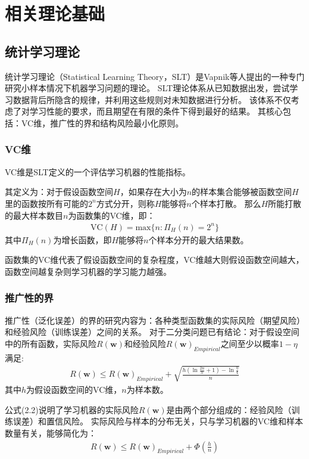 \chapter{相关理论基础}

\section{统计学习理论}

统计学习理论（Statistical Learning Theory，SLT）是Vapnik等人提出的一种专门研究小样本情况下机器学习问题的理论\cite{vapnik2013nature}。
SLT理论体系从已知数据出发，尝试学习数据背后所隐含的规律，并利用这些规则对未知数据进行分析。
该体系不仅考虑了对学习性能的要求，而且期望在有限的条件下得到最好的结果。
其核心包括：VC维，推广性的界和结构风险最小化原则。

\subsection{VC维}

VC维是SLT定义的一个评估学习机器的性能指标。

其定义为：对于假设函数空间$H$，如果存在大小为$n$的样本集合能够被函数空间$H$里的函数按所有可能的$2^n$方式分开，则称$H$能够将$n$个样本打散。
那么$H$所能打散的最大样本数目$n$为函数集的VC维，即：
\begin{align}
    \mathrm{VC}(H)=\mathrm{max}\{n:\Pi_H(n)=2^n\}
\end{align}
其中$\Pi_H(n)$为增长函数，即$H$能够将$n$个样本分开的最大结果数。

函数集的VC维代表了假设函数空间的复杂程度，VC维越大则假设函数空间越大，函数空间越复杂则学习机器的学习能力越强。

\subsection{推广性的界}

推广性（泛化误差）的界的研究内容为：各种类型函数集的实际风险（期望风险）和经验风险（训练误差）之间的关系。
对于二分类问题已有结论：对于假设空间中的所有函数，实际风险$R(\mathbf{w})$和经验风险$R(\mathbf{w})_{Empirical}$之间至少以概率$1-\eta$满足:
\begin{align}
    R(\mathbf{w})\leq R(\mathbf{w})_{Empirical} + \sqrt{\frac{h(\ln{\frac{2n}{h}+1}) - \ln{\frac{\eta}{4}}}{n}}
\end{align}
其中$h$为假设函数空间的VC维，$n$为样本数。

公式(2.2)说明了学习机器的实际风险$R(\mathbf{w})$是由两个部分组成的：经验风险（训练误差）和置信风险。
实际风险与样本的分布无关，只与学习机器的VC维和样本数量有关，能够简化为：
\begin{align}
    R(\mathbf{w})\leq R(\mathbf{w})_{Empirical} + \Phi(\frac{h}{n})
\end{align}

